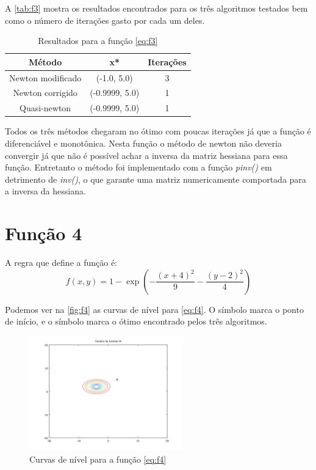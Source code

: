\documentclass[12pt]{article}
\begin{document}
A \autoref{tab:f3} mostra os resultados encontrados para os três algoritmos testados bem como o número de iterações gasto por cada um deles.

\begin{table}[H]
\centering
\begin{tabular}{*3c}
\toprule
Método			&	x*		&	Iterações\\
\midrule
Newton modificado	&	(-1.0, 5.0)	&	3\\
Newton corrigido	&	(-0.9999, 5.0)	&	1\\
Quasi-newton		&	(-0.9999, 5.0)	&	1\\
\bottomrule
\end{tabular}
\caption{\small{Resultados para a função \autoref{eq:f3} }}
\label{tab:f3}
\end{table}

Todos os três métodos chegaram no ótimo com poucas iterações já que a função é diferenciável e monotônica. Nesta função o método de newton não deveria convergir já que 
não é possível achar a inversa da matriz hessiana para essa função. Entretanto o método foi implementado com a função \textit{pinv()} em detrimento de \textit{inv()},
o que garante uma matriz numericamente comportada para a inversa da hessiana.

\section{Função 4}
A regra que define a função é:
\begin{equation}
\label{eq:f4}
f(x, y) = 1 - \exp(-\frac{(x+4)^2}{9} - \frac{(y-2)^2}{4})
\end{equation}

Podemos ver na \autoref{fig:f4} as curvas de nível para \autoref{eq:f4}. O símbolo \textit{\textopenbullet} marca o ponto de início,
e o símbolo \textit{\texttimes} marca o ótimo encontrado pelos três algoritmos.

\begin{figure}[H]
  \centering
  \includegraphics[width=250px]{../matlab/images/f4_contour}
  \caption{Curvas de nível para a função \autoref{eq:f4}}
  \label{fig:f4}
\end{figure}
\end{document}
